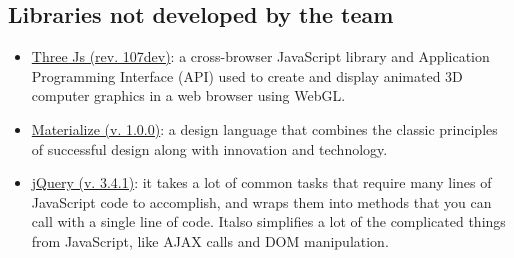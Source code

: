 \documentclass{article}
\begin{document}
\subsection{Libraries not developed by the team}
\begin{itemize}
	\item \href{https://threejs.org/}{Three Js (rev. 107dev)}: a cross-browser JavaScript library and Application Programming Interface (API) used to create and display animated 3D computer graphics in a web browser using WebGL.
	\item \href{https://materializecss.com/}{Materialize (v. 1.0.0)}: a design language that combines the classic principles of successful design along with innovation and technology.
	\item \href{https://jquery.com/}{jQuery (v. 3.4.1)}: it takes a lot of common tasks that require many lines of JavaScript code to accomplish, and wraps them into methods that you can call with a single line of code. Italso simplifies a lot of the complicated things from JavaScript, like AJAX calls and DOM manipulation.
\end{itemize}
\end{document}
